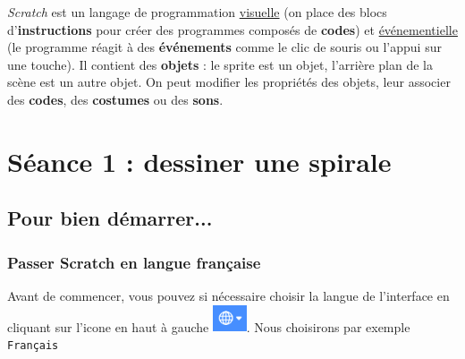\vspace{10pt}
\emph{Scratch} est un langage de programmation \underline{visuelle} (on place des blocs d'\textbf{instructions} pour créer des programmes composés de \textbf{codes}) et \underline{événementielle} (le programme réagit à des \textbf{événements} comme le clic de souris ou l'appui sur une touche). Il contient des \textbf{objets} : le sprite est un objet, l'arrière plan de la scène est un autre objet. On peut modifier les propriétés des objets, leur associer des \textbf{codes}, des \textbf{costumes} ou des \textbf{sons}.   












\newpage







%
%
%
%



\section{Séance 1 : dessiner une spirale}\label{ficheScratch5e1}

\subsection{Pour bien démarrer...}

\vspace{10pt}

\subsubsection{Passer Scratch en langue française} 

Avant de commencer, vous pouvez si nécessaire choisir la langue de l'interface en cliquant sur l'icone en haut à gauche  \includegraphics[width=1cm]{./images/scratch02/changerLangue.png}. Nous choisirons par exemple \texttt{Français}




